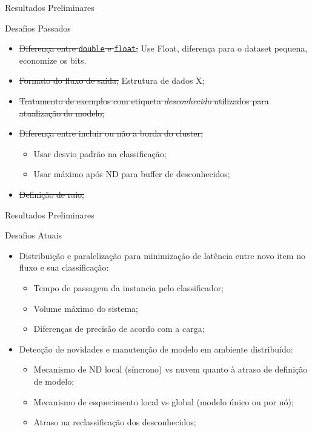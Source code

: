 \documentclass[aspectratio=43,10pt]{beamer}
\begin{document}
\begin{frame}[fragile]{Resultados Preliminares}
  \begin{alertblock}{Desafios Passados}
    \begin{itemize}
      \item \sout{Diferença entre \texttt{double} e \texttt{float};}
        Use Float, diferença para o dataset pequena, economize os bits.
      \item \sout{Formato do fluxo de saída;}
        Estrutura de dados X;
      \item \sout{Tratamento de exemplos com etiqueta \textit{desconhecido} utilizados para atualização do modelo;}

      \item \sout{Diferença entre incluir ou não a borda do cluster;}
      \begin{itemize}
        \item Usar desvio padrão na classificação;
        \item Usar máximo após ND para buffer de desconhecidos;
      \end{itemize}
      \item \sout{Definição de raio;}
    \end{itemize}
  \end{alertblock}
\end{frame}
\begin{frame}[fragile]{Resultados Preliminares}
  \begin{alertblock}{Desafios Atuais}
    \begin{itemize}
      \item Distribuição e paralelização para minimização de latência entre
      novo item no fluxo e sua classificação:
      \begin{itemize}
        \item Tempo de passagem da instancia pelo classificador;
        \item Volume máximo do sistema;
        \item Diferenças de precisão de acordo com a carga;
      \end{itemize}
      \item Detecção de novidades e manutenção de modelo em ambiente distribuído:
      \begin{itemize}
        \item Mecanismo de ND local (síncrono) vs nuvem quanto à atraso de definição de modelo;
        \item Mecanismo de esquecimento local vs global (modelo único ou por nó);
        \item Atraso na reclassificação dos desconhecidos;
      \end{itemize}
    \end{itemize}
  \end{alertblock}
\end{frame}
\end{document}
